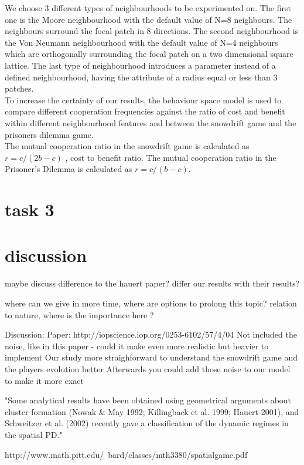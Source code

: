 \documentclass[DIV=calc, paper=a4, fontsize=11pt, twocolumn]{scrartcl}	 %
\begin{document}
We choose 3 different types of neighbourhoods to be experimented on. The first one is the Moore neighbourhood with the default value of N=8 neighbours. The neighbours surround the focal patch in 8 directions. The second neighbourhood is the Von Neumann neighbourhood with the default value of N=4 neighbours which are orthogonally surrounding the focal patch on a two dimensional square lattice. The last type of neighbourhood introduces a parameter instead of a defined neighbourhood, having the attribute of a radius equal or less than 3 patches. \\
To increase the certainty of our results, the behaviour space model is used to compare different cooperation frequencies against the ratio of cost and benefit within different neighbourhood features and between the snowdrift game and the prisoners dilemma game. \\
The mutual cooperation ratio in the snowdrift game is calculated as $r = c / (2b-c)$ , cost to benefit ratio. The mutual cooperation ratio in the Prisoner's Dilemma is calculated as $r = c/ (b-c) $.\

\section*{task 3}



\section*{discussion}

maybe discuss difference to the hauert paper? 
differ our results with their results? 

where can we give in more time, where are options to prolong this topic? relation to nature, where is the importance here ? 

Discussion: 
Paper: http://iopscience.iop.org/0253-6102/57/4/04
Not included the noise, like in this paper  - could it make even more realistic but heavier to implement
Our study more straighforward to understand the snowdrift game and the players evolution better
Afterwards you could add those noise to our model to make it more exact

"Some analytical results have been obtained using geometrical arguments about cluster formation (Nowak & May 1992; Killingback et al. 1999; Hauert 2001), and Schweitzer et al. (2002) recently gave a classification of the dynamic regimes in the spatial PD."

http://www.math.pitt.edu/~bard/classes/mth3380/spatialgame.pdf
\end{document}
